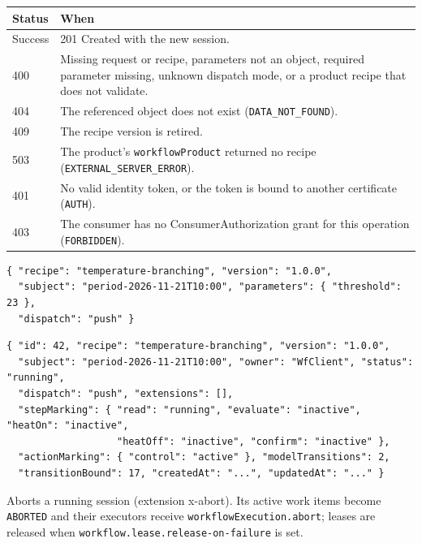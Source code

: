 \documentclass[a4paper]{arrowhead}
\begin{document}
{\small
\begin{longtable}{|p{2.0cm}|p{13.8cm}|}

\hline
\rowcolor{gray!33} Status & When \\ \hline
\endhead
Success & 201 Created with the new session. \\ \hline
400 & Missing request or recipe, parameters not an object, required parameter missing, unknown dispatch mode, or a product recipe that does not validate. \\ \hline
404 & The referenced object does not exist (\texttt{DATA\_NOT\_FOUND}). \\ \hline
409 & The recipe version is retired. \\ \hline
503 & The product's \texttt{workflowProduct} returned no recipe (\texttt{EXTERNAL\_SERVER\_ERROR}). \\ \hline
401 & No valid identity token, or the token is bound to another certificate (\texttt{AUTH}). \\ \hline
403 & The consumer has no ConsumerAuthorization grant for this operation (\texttt{FORBIDDEN}). \\ \hline
\end{longtable}
}


\begin{lstlisting}[caption={Example request body}]
{ "recipe": "temperature-branching", "version": "1.0.0",
  "subject": "period-2026-11-21T10:00", "parameters": { "threshold": 23 },
  "dispatch": "push" }
\end{lstlisting}


\begin{lstlisting}[caption={Example response body}]
{ "id": 42, "recipe": "temperature-branching", "version": "1.0.0",
  "subject": "period-2026-11-21T10:00", "owner": "WfClient", "status": "running",
  "dispatch": "push", "extensions": [],
  "stepMarking": { "read": "running", "evaluate": "inactive", "heatOn": "inactive",
                   "heatOff": "inactive", "confirm": "inactive" },
  "actionMarking": { "control": "active" }, "modelTransitions": 2,
  "transitionBound": 17, "createdAt": "...", "updatedAt": "..." }
\end{lstlisting}

Aborts a running session (extension x-abort). Its active work items become \texttt{ABORTED} and their executors receive \texttt{workflowExecution.abort}; leases are released when \texttt{workflow.lease.release-on-failure} is set.
\end{document}
